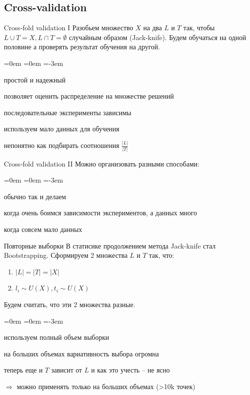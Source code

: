 \documentclass[14pt, fleqn, xcolor={dvipsnames, table}]{beamer}
\begin{document}
\subsection{Cross-validation}

\begin{frame}{Cross-fold validation I}
Разобьем множество $X$ на два $L$ и $T$ так, чтобы $L \cup T = X, L \cap T = \emptyset$ случайным образом (Jack-knife).
Будем обучаться на одной половине а проверять результат обучения на другой.
\begin{description}
\itemindent=0em
=0em
\leftskip=-3em
  \item[\color{green}+] простой и надежный
  \item[\color{green}+] позволяет оценить распределение на множестве решений
  \item[\color{red}--] последовательные эксперименты зависимы
  \item[\color{red}--] используем мало данных для обучения
  \item[\color{red}--] непонятно как подбирать соотношения $\frac{|L|}{|T|}$
\end{description}
\end{frame}

\begin{frame}{Cross-fold validation II}
Можно организовать разными способами:
\begin{description}
\itemindent=0em
=0em
\leftskip=-3em
  \item[2-fold] обычно так и делаем
  \item[k-fold] когда очень боимся зависимости экспериментов, а данных много
  \item[Leave-one-out (LOOCV)] когда совсем мало данных
\end{description}
\end{frame}


\begin{frame}{Повторные выборки}
В статисике продолжением метода Jack-knife стал Bootstrapping.
Сформируем 2 множества $L$ и $T$ так, что:
\begin{enumerate}
  \item $|L| = |T| = |X|$
  \item $l_i \sim U(X), t_i \sim U(X)$
\end{enumerate}
Будем считать, что эти 2 множества разные.
\begin{description}
\itemindent=0em
=0em
\leftskip=-3em
  \item[\color{green}+] используем полный объем выборки
  \item[\color{green}+] на больших объемах вариативность выбора огромна
  \item[\color{red}--] теперь еще и $T$ зависит от $L$ и как это учесть -- не ясно
\end{description}
$\Rightarrow$ можно применять только на больших объемах (>10k точек)
\end{frame}
\end{document}
